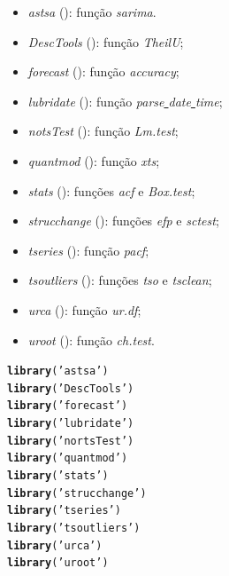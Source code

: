 \documentclass{article}\usepackage[]{graphicx}\usepackage[]{color}
\makeatletter
\newcommand{\hlstr}[1]{\textcolor[rgb]{0.192,0.494,0.8}{#1}}%
\newcommand{\hlstd}[1]{\textcolor[rgb]{0.345,0.345,0.345}{#1}}%
\newcommand{\hlkwd}[1]{\textcolor[rgb]{0.737,0.353,0.396}{\textbf{#1}}}%
\newenvironment{kframe}{%
 \def\at@end@of@kframe{}%
 \ifinner\ifhmode%
  \def\at@end@of@kframe{\end{minipage}}%
  \begin{minipage}{\columnwidth}%
 \fi\fi%
 \def\FrameCommand##1{\hskip\@totalleftmargin \hskip-\fboxsep
 \colorbox{shadecolor}{##1}\hskip-\fboxsep
     \hskip-\linewidth \hskip-\@totalleftmargin \hskip\columnwidth}%
 \MakeFramed {\advance\hsize-\width
   \@totalleftmargin\z@ \linewidth\hsize
   \@setminipage}}%
 {\par\unskip\endMakeFramed%
 \at@end@of@kframe}
\newenvironment{knitrout}{}{} %
\makeatother
\begin{document}
        \begin{itemize}
            \item \textit{astsa} (\cite{astsa}): função \textit{sarima}.
            \item \textit{DescTools} (\cite{desctools}): função \textit{TheilU};
            \item \textit{forecast} (\cite{forecast}): função \textit{accuracy};
            \item \textit{lubridate} (\cite{lubridate}): função \textit{parse\underline{ }date\underline{ }time};
            \item \textit{notsTest} (\cite{nortstest}): função \textit{Lm.test};
            \item \textit{quantmod} (\cite{quantmod}): função \textit{xts};
            \item \textit{stats} (\cite{stats}): funções \textit{acf} e \textit{Box.test};
            \item \textit{strucchange} (\cite{strucchange}): funções \textit{efp} e \textit{sctest};
            \item \textit{tseries} (\cite{tseries}): função \textit{pacf};
            \item \textit{tsoutliers} (\cite{tsoutliers}): funções \textit{tso} e \textit{tsclean};
            \item \textit{urca} (\cite{urca}): função \textit{ur.df};
            \item \textit{uroot} (\cite{uroot}): função \textit{ch.test}.
        \end{itemize}
    
\begin{knitrout}
\color{fgcolor}\begin{kframe}
\begin{alltt}
\hlkwd{library}\hlstd{(}\hlstr{'astsa'}\hlstd{)}
\hlkwd{library}\hlstd{(}\hlstr{'DescTools'}\hlstd{)}
\hlkwd{library}\hlstd{(}\hlstr{'forecast'}\hlstd{)}
\hlkwd{library}\hlstd{(}\hlstr{'lubridate'}\hlstd{)}
\hlkwd{library}\hlstd{(}\hlstr{'nortsTest'}\hlstd{)}
\hlkwd{library}\hlstd{(}\hlstr{'quantmod'}\hlstd{)}
\hlkwd{library}\hlstd{(}\hlstr{'stats'}\hlstd{)}
\hlkwd{library}\hlstd{(}\hlstr{'strucchange'}\hlstd{)}
\hlkwd{library}\hlstd{(}\hlstr{'tseries'}\hlstd{)}
\hlkwd{library}\hlstd{(}\hlstr{'tsoutliers'}\hlstd{)}
\hlkwd{library}\hlstd{(}\hlstr{'urca'}\hlstd{)}
\hlkwd{library}\hlstd{(}\hlstr{'uroot'}\hlstd{)}
\end{alltt}
\end{kframe}
\end{knitrout}
\end{document}

